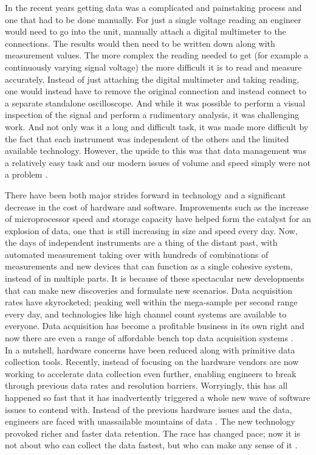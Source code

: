 In the recent years getting data was a complicated and painstaking process and one that had to be done manually. For just a single voltage reading an engineer would need to go into the unit, manually attach a digital multimeter to the connections. The results would then need to be written down along with measurement values. The more complex the reading needed to get (for example a continuously varying signal voltage) the more difficult it is to read and measure accurately. Instead of just attaching the digital multimeter and taking reading, one would instead have to remove the original connection and instead connect to a separate standalone oscilloscope. And while it was possible to perform a visual inspection of the signal and perform a rudimentary analysis, it was challenging work. And not only was it a long and difficult task, it was made more difficult by the fact that each instrument was independent of the others and the limited available technology. However, the upside to this was that data management was a relatively easy task and our modern issues of volume and speed simply were not a problem \cite{mesurementsystems}.

There have been both major strides forward in technology and a significant decrease in the cost of hardware and software. Improvements such as the increase of microprocessor speed and storage capacity have helped form the catalyst for an explosion of data, one that is still increasing in size and speed every day. Now, the days of independent instruments are a thing of the distant past, with automated measurement taking over with hundreds of combinations of measurements and new devices that can function as a single cohesive system, instead of in multiple parts. It is because of these spectacular new developments that can make new discoveries and formulate new scenarios. Data acquisition rates have skyrocketed; peaking well within the mega-sample per second range every day, and technologies like high channel count systems are available to everyone. Data acquisition has become a profitable business in its own right and now there are even a range of affordable bench top data acquisition systems \cite{di2013data}.\\

In a nutshell, hardware concerns have been reduced along with primitive data collection tools. Recently, instead of focusing on the hardware vendors are now working to accelerate data collection even further, enabling engineers to break through previous data rates and resolution barriers. Worryingly, this has all happened so fast that it has inadvertently triggered a whole new wave of software issues to contend with. Instead of the previous hardware issues and the data, engineers are faced with unassailable mountains of data \cite{mininghighspeed}. The new technology provoked richer and faster data retention. The race has changed pace; now it is not about who can collect the data fastest, but who can make any sense of it \cite{chen2011essential}.

